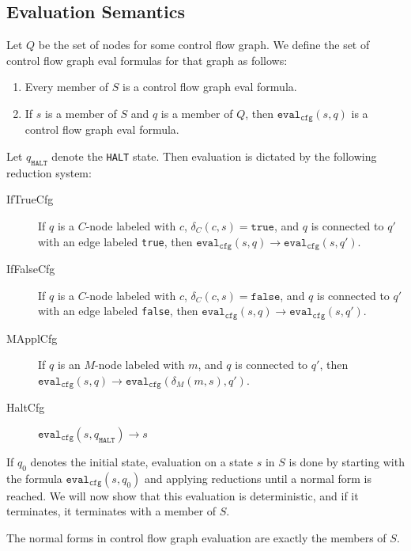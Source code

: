 \documentclass[11pt]{article}
\begin{document}
\subsection{Evaluation Semantics}

Let $Q$ be the set of nodes for some control flow graph.  We define the set of control flow graph eval formulas for that graph as follows:

\begin{enumerate}
\item Every member of $S$ is a control flow graph eval formula.
\item If $s$ is a member of $S$ and $q$ is a member of $Q$, then $\texttt{eval}_{\texttt{cfg}}(s, q)$ is a control flow graph eval formula.
\end{enumerate}

Let $q_{\texttt{HALT}}$ denote the \texttt{HALT} state.  Then evaluation is dictated by the following reduction system:

\begin{description}
\item[IfTrueCfg] If $q$ is a $C$-node labeled with $c$, $\delta_{C}(c, s) = \texttt{true}$, and $q$ is connected to $q'$ with an edge labeled \texttt{true}, then $\texttt{eval}_{\texttt{cfg}}(s, q) \longrightarrow \texttt{eval}_{\texttt{cfg}}(s, q')$.
\item[IfFalseCfg] If $q$ is a $C$-node labeled with $c$, $\delta_{C}(c, s) = \texttt{false}$, and $q$ is connected to $q'$ with an edge labeled \texttt{false}, then $\texttt{eval}_{\texttt{cfg}}(s, q) \longrightarrow \texttt{eval}_{\texttt{cfg}}(s, q')$.
\item[MApplCfg] If $q$ is an $M$-node labeled with $m$, and $q$ is connected to $q'$, then $\texttt{eval}_{\texttt{cfg}}(s, q) \longrightarrow \texttt{eval}_{\texttt{cfg}}(\delta_{M}(m, s), q')$.
\item[HaltCfg] $\texttt{eval}_{\texttt{cfg}}(s, q_{\texttt{HALT}}) \longrightarrow s$
\end{description}

If $q_{0}$ denotes the initial state, evaluation on a state $s$ in $S$ is done by starting with the formula $\texttt{eval}_{\texttt{cfg}}(s, q_{0})$ and applying reductions until a normal form is reached.  We will now show that this evaluation is deterministic, and if it terminates, it terminates with a member of $S$.

\newtheorem*{evalcfgnormalforms}{Theorem}
\begin{evalnormalforms}
The normal forms in control flow graph evaluation are exactly the members of $S$.
\end{evalnormalforms}
\end{document}
